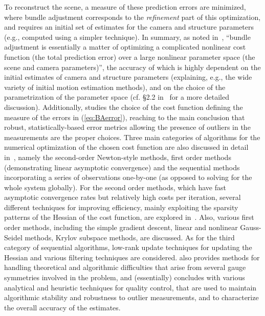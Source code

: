 \documentclass[10pt]{article}
\begin{document}
To reconstruct the scene, a measure of these prediction errors are minimized, where bundle adjustment corresponds to the \textit{refinement} part of this optimization, and requires an initial set of estimates for the camera and structure parameters (e.g., computed using a simpler technique). In summary, as noted in~\cite{BundleAdjustment}, ``bundle adjustment is essentially a matter of optimizing a complicated nonlinear cost function (the total prediction error) over a large nonlinear parameter space (the scene and camera parameters)'', the accuracy of which is highly dependent on the initial estimates of camera and structure parameters (explaining, e.g., the wide variety of initial motion estimation methods), and on the choice of the parametrization of the parameter space (cf. \S2.2 in~\cite{BundleAdjustment} for a more detailed discussion). Additionally, \cite{BundleAdjustment} studies the choice of the cost function defining the measure of the errors in (\ref{eq:BAerror}), reaching to the main conclusion that robust, statistically-based error metrics allowing the presence of outliers in the measurements are the proper choices. Three main categories of algorithms for the numerical optimization of the chosen cost function are also discussed in detail in~\cite{BundleAdjustment}, namely the second-order Newton-style methods, first order methods (demonstrating linear asymptotic convergence) and the sequential methods incorporating a series of observations one-by-one (as opposed to solving for the whole system globally). For the second order methods, which have fast asymptotic convergence rates but relatively high costs per iteration, several different techniques for improving efficiency, mainly exploiting the sparsity patterns of the Hessian of the cost function, are explored in~\cite{BundleAdjustment}. Also, various first order methods, including the simple gradient descent, linear and nonlinear Gauss-Seidel methods, Krylov subspace methods, are discussed. As for the third category of sequential algorithms, low-rank update techniques for updating the Hessian and various filtering techniques are considered. \cite{BundleAdjustment} also provides methods for handling theoretical and algorithmic difficulties that arise from several gauge symmetries involved in the problem, and (essentially) concludes with various analytical and heuristic techniques for quality control, that are used to maintain algorithmic stability and robustness to outlier measurements, and to characterize the overall accuracy of the estimates.
\end{document}
